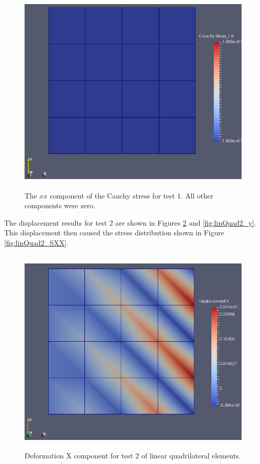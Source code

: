 \documentclass[a4paper, 12pt]{article}
\begin{document}
\begin{figure}[H]
  \centering
  \includegraphics[width=13cm, height=10cm]{quad_4_t1_Sxx}
  \caption{The $xx$ component of the Cauchy stress for test 1.
            All other components were zero.}
  \label{fig:linQuad1_SXX}
\end{figure}

The displacement results for test 2 are shown in 
Figures \ref{fig:linQuad2_x} and \ref{fig:linQuad2_y}.
This displacement then caused the stress distribution 
shown in Figure \ref{fig:linQuad2_SXX}.

\begin{figure}[H]
  \centering
  \includegraphics[width=13cm, height=10cm]{quad_4_t2_disp_X}
  \caption{Deformation X component for test 2 of linear 
            quadrilateral elements.}
  \label{fig:linQuad2_x}
\end{figure}
\end{document}
